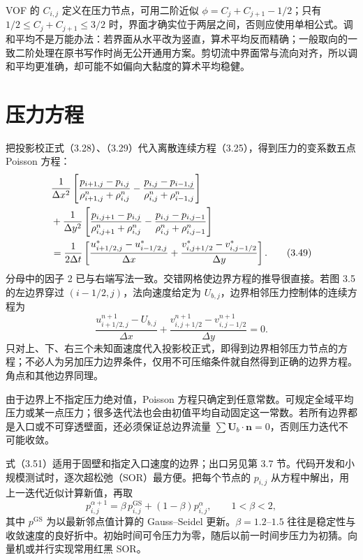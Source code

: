 \documentclass[11pt,a4paper,openany,fontset=none]{ctexbook}
\newenvironment{sourceblock}
  {\par\addvspace{0.65\baselineskip}\noindent\begin{minipage}{\linewidth}\centering}
  {\end{minipage}\par\addvspace{0.48\baselineskip}}
\begin{document}
VOF 的 $C_{i,j}$ 定义在压力节点，可用二阶近似 $\phi=C_j+C_{j+1}-1/2$；只有 $1/2\le C_j+C_{j+1}\le3/2$ 时，界面才确实位于两层之间，否则应使用单相公式。调和平均不是万能办法：若界面从水平改为竖直，算术平均反而精确；一般取向的一致二阶处理在原书写作时尚无公开通用方案。剪切流中界面常与流向对齐，所以调和平均更准确，却可能不如偏向大黏度的算术平均稳健。

\section{压力方程}

把投影校正式（3.28）、（3.29）代入离散连续方程（3.25），得到压力的变系数五点 Poisson 方程：
\begin{align}
 &\frac1{\Delta x^2}\left[
 \frac{p_{i+1,j}-p_{i,j}}{\rho_{i+1,j}^n+\rho_{i,j}^n}
 -\frac{p_{i,j}-p_{i-1,j}}{\rho_{i,j}^n+\rho_{i-1,j}^n}\right] \notag\\
 &+\frac1{\Delta y^2}\left[
 \frac{p_{i,j+1}-p_{i,j}}{\rho_{i,j+1}^n+\rho_{i,j}^n}
 -\frac{p_{i,j}-p_{i,j-1}}{\rho_{i,j}^n+\rho_{i,j-1}^n}\right] \notag\\
 &=\frac1{2\Delta t}\left[
 \frac{u_{i+1/2,j}^*-u_{i-1/2,j}^*}{\Delta x}
 +\frac{v_{i,j+1/2}^*-v_{i,j-1/2}^*}{\Delta y}\right]. \tag{3.49}
\end{align}
分母中的因子 2 已与右端写法一致。交错网格使边界方程的推导很直接。若图 3.5 的左边界穿过 $(i-1/2,j)$，法向速度给定为 $U_{b,j}$，边界相邻压力控制体的连续方程为
\begin{equation}
 \frac{u_{i+1/2,j}^{n+1}-U_{b,j}}{\Delta x}
 +\frac{v_{i,j+1/2}^{n+1}-v_{i,j-1/2}^{n+1}}{\Delta y}=0. \tag{3.50}
\end{equation}
只对上、下、右三个未知面速度代入投影校正式，即得到边界相邻压力节点的方程；不必人为另加压力边界条件，仅用不可压缩条件就自然得到正确的边界方程。角点和其他边界同理。

\begin{sourceblock}
\end{sourceblock}

由于边界上不指定压力绝对值，Poisson 方程只确定到任意常数。可规定全域平均压力或某一点压力；很多迭代法也会由初值平均自动固定这一常数。若所有边界都是入口或不可穿透壁面，还必须保证总边界流量 $\sum\bm U_b\cdot\bm n=0$，否则压力迭代不可能收敛。

式（3.51）适用于固壁和指定入口速度的边界；出口另见第 3.7 节。代码开发和小规模测试时，逐次超松弛（SOR）最方便。把每个节点的 $p_{i,j}$ 从方程中解出，用上一迭代近似计算新值，再取
\begin{equation}
 p_{i,j}^{\alpha+1}=\beta\,p_{i,j}^{\mathrm{GS}}+(1-\beta)p_{i,j}^{\alpha},\qquad 1<\beta<2, \tag{3.52}
\end{equation}
其中 $p^{\mathrm{GS}}$ 为以最新邻点值计算的 Gauss--Seidel 更新。$\beta=1.2$--$1.5$ 往往是稳定性与收敛速度的良好折中。初始时间可令压力为零，随后以前一时间步压力为初猜。向量机或并行实现常用红黑 SOR。
\end{document}
